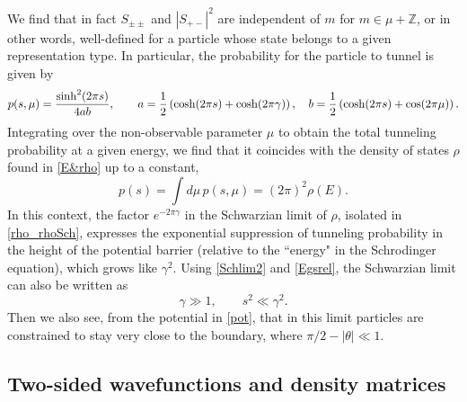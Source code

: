 \documentclass[12pt]{article}
\newcommand{\be}{\begin{equation}}
\newcommand{\ee}{\end{equation}}
\newcommand{\ZZ}{\mathbb{Z}}
\newcommand{\tht}{\theta}
\newcommand{\om}{\omega}
\newcommand{\ga}{\gamma}
\newcommand{\Ga}{\Gamma}
\newcommand{\ov}{\over}
\begin{document}
We find that in fact $S_{\pm\pm}$ and $|S_{+-}|^2$ are independent of $m$ for $m\in\mu+\ZZ$, or in other words, well-defined for a particle whose state belongs to a given representation type. In particular, the probability for the particle to tunnel is given by
\be \label{tunp}
p(s, \mu)={\sinh^2(2 \pi s) \ov 4 a b}, \qquad a={1 \ov 2}\left( \cosh(2\pi s)+\cosh(2\pi\ga)\right),\quad b={1 \ov 2}\left( \cosh(2\pi s)+\cos (2\pi\mu)\right).
\ee
Integrating over the non-observable parameter $\mu$ to obtain the total tunneling probability at a given energy, we find that it coincides with the density of states $\rho$ found in \eqref{E&rho} up to a constant,
\be
p(s)=\int d\mu\, p(s, \mu)=(2\pi)^2 \rho(E).
\ee
In this context, the factor $e^{-2\pi\ga}$ in the Schwarzian limit of $\rho$, isolated in \eqref{rho_rhoSch}, expresses the exponential suppression of tunneling probability in the height of the potential barrier (relative to the ``energy" in the Schrodinger equation), which grows like $\ga^2$. Using \eqref{Schlim2} and \eqref{Egsrel}, the Schwarzian limit can also be written as
\be \label{Schlim3}
\ga \gg 1, \qquad s^2 \ll \ga^2.
\ee
Then we also see, from the potential in \eqref{pot}, that in this limit particles are constrained to stay very close to the boundary, where $\pi/2-|\tht| \ll 1$.



\subsection{Two-sided wavefunctions and density matrices}
\end{document}
